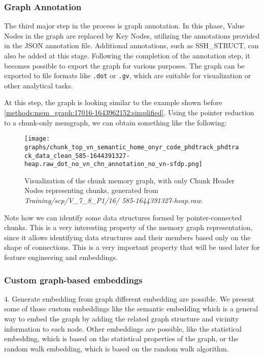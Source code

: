 \subsubsection{Graph Annotation}

The third major step in the process is graph annotation. In this phase, Value Nodes in the graph are replaced by Key Nodes, utilizing the annotations provided in the JSON annotation file. Additional annotations, such as SSH\_STRUCT, can also be added at this stage. Following the completion of the annotation step, it becomes possible to export the graph for various purposes. The graph can be exported to file formats like \texttt{.dot} or \texttt{.gv}, which are suitable for visualization or other analytical tasks.

At this step, the graph is looking similar to the example shown before \ref{methods:mem_graph:17016-1643962152:simplified}. Using the pointer reduction to a chunk-only \gls{memgraph}, we can obtain something like the following:

\begin{figure}[H]\label{methods:mem_graph:585-1644391327:chunk_only}
    \centering
    \texttt{[image: graphs/chunk\_top\_vn\_semantic\_home\_onyr\_code\_phdtrack\_phdtrack\_data\_clean\_585-1644391327-heap.raw\_dot\_no\_vn\_chn\_annotation\_no\_vn-sfdp.png]}
    \caption{Visualization of the chunk memory graph, with only Chunk Header Nodes representing chunks, generated from \textit{Training/scp/V\_7\_8\_P1/16/
    585-1644391327-heap.raw}.}
\end{figure}

Note how we can identify some data structures formed by pointer-connected chunks. This is a very interesting property of the memory graph representation, since it allows identifying data structures and their members based only on the shape of connections. This is a very important property that will be used later for feature engineering and embeddings.

\subsubsection{Custom graph-based embeddings}
4. Generate embedding from graph
different embedding are possible. We present some of those custom embeddings like the semantic embedding which is a general way to embed the graph by adding the related graph structure and vicinity information to each node. Other embeddings are possible, like the statistical embedding, which is based on the statistical properties of the graph, or the random walk embedding, which is based on the random walk algorithm. 

